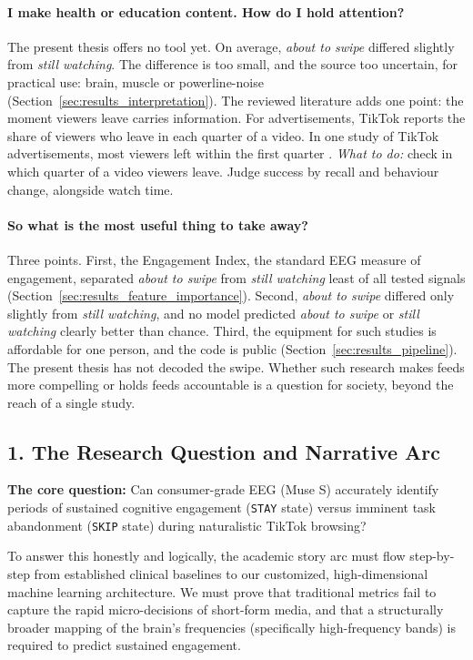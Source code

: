 \documentclass[12pt,a4paper]{report}
\begin{document}
\paragraph{I make health or education content. How do I hold attention?}
The present thesis offers no tool yet. On average, \emph{about to swipe} differed slightly from \emph{still watching}. The difference is too small, and the source too uncertain, for practical use: brain, muscle or powerline-noise (Section~\ref{sec:results_interpretation}). The reviewed literature adds one point: the moment viewers leave carries information. For advertisements, TikTok reports the share of viewers who leave in each quarter of a video. In one study of TikTok advertisements, most viewers left within the first quarter \cite{salminen_engagement_2024}.
\emph{What to do:} check in which quarter of a video viewers leave. Judge success by recall and behaviour change, alongside watch time.

\paragraph{So what is the most useful thing to take away?}
Three points. First, the Engagement Index, the standard EEG measure of engagement, separated \emph{about to swipe} from \emph{still watching} least of all tested signals (Section~\ref{sec:results_feature_importance}). Second, \emph{about to swipe} differed only slightly from \emph{still watching}, and no model predicted \emph{about to swipe} or \emph{still watching} clearly better than chance. Third, the equipment for such studies is affordable for one person, and the code is public (Section~\ref{sec:results_pipeline}). The present thesis has not decoded the swipe. Whether such research makes feeds more compelling or holds feeds accountable is a question for society, beyond the reach of a single study.

\iffalse
\subsection{1. The Research Question and Narrative Arc}
\textbf{The core question:} Can consumer-grade EEG (Muse S) accurately identify periods of sustained cognitive engagement (\texttt{STAY} state) versus imminent task abandonment (\texttt{SKIP} state) during naturalistic TikTok browsing?

To answer this honestly and logically, the academic story arc must flow step-by-step from established clinical baselines to our customized, high-dimensional machine learning architecture. We must prove that traditional metrics fail to capture the rapid micro-decisions of short-form media, and that a structurally broader mapping of the brain's frequencies (specifically high-frequency bands) is required to predict sustained engagement.
\end{document}
